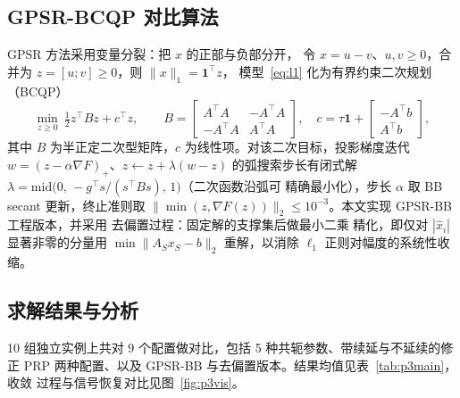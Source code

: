 \documentclass[withoutpreface,bwprint]{cumcmthesis}
\begin{document}
\subsection{GPSR-BCQP 对比算法}

GPSR 方法采用变量分裂：把 $x$ 的正部与负部分开，
令 $x=u-v$、$u,v\ge0$，合并为 $z=[u;v]\ge0$，则 $\|x\|_1=\mathbf{1}^{\top}z$，
模型~\eqref{eq:l1} 化为有界约束二次规划（BCQP）
\begin{equation}
  \min_{z\ge0}\ \tfrac12 z^{\top}Bz+c^{\top}z,\qquad
  B=\begin{bmatrix}A^{\top}A&-A^{\top}A\\-A^{\top}A&A^{\top}A\end{bmatrix},\quad
  c=\tau\mathbf{1}+\begin{bmatrix}-A^{\top}b\\ A^{\top}b\end{bmatrix},
\end{equation}
其中 $B$ 为半正定二次型矩阵，$c$ 为线性项。对该二次目标，投影梯度迭代
$w=(z-\alpha\nabla F)_+$、$z\leftarrow z+\lambda(w-z)$ 的弧搜索步长有闭式解
$\lambda=\mathrm{mid}\big(0,\,-g^{\top}s/(s^{\top}Bs),\,1\big)$（二次函数沿弧可
精确最小化），步长 $\alpha$ 取 BB secant 更新，终止准则取
$\|\min(z,\nabla F(z))\|_2\le10^{-3}$。本文实现 GPSR-BB 工程版本，并采用
去偏置过程：固定解的支撑集后做最小二乘
精化，即仅对 $|\hat x_i|$ 显著非零的分量用 $\min\|A_Sx_S-b\|_2$ 重解，以消除
$\ell_1$ 正则对幅度的系统性收缩。

\subsection{求解结果与分析}

10 组独立实例上共对 9 个配置做对比，包括 5 种共轭参数、带续延与不延续的修正
PRP 两种配置、以及 GPSR-BB 与去偏置版本。结果均值见表~\ref{tab:p3main}，收敛
过程与信号恢复对比见图~\ref{fig:p3vis}。
\end{document}
